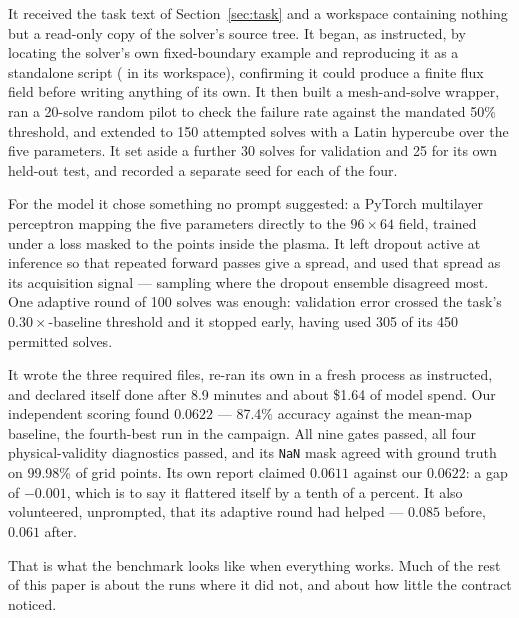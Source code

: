 It received the task text of Section~\ref{sec:task} and a workspace containing
nothing but a read-only copy of the solver's source tree. It began, as
instructed, by locating the solver's own fixed-boundary example and reproducing
it as a standalone script ( in its workspace),
confirming it could produce a finite flux field before writing anything of its
own. It then built a mesh-and-solve wrapper, ran a 20-solve random pilot to
check the failure rate against the mandated 50\% threshold, and extended to 150
attempted solves with a Latin hypercube over the five parameters. It set aside
a further 30 solves for validation and 25 for its own held-out test, and
recorded a separate seed for each of the four.

For the model it chose something no prompt suggested: a PyTorch multilayer
perceptron mapping the five parameters directly to the $96\times64$ field,
trained under a loss masked to the points inside the plasma. It left dropout
active at inference so that repeated forward passes give a spread, and used
that spread as its acquisition signal --- sampling where the dropout ensemble
disagreed most. One adaptive round of 100 solves was enough: validation error
crossed the task's $0.30\times$-baseline threshold and it stopped early, having
used 305 of its 450 permitted solves.

It wrote the three required files, re-ran its own  in a fresh
process as instructed, and declared itself done after 8.9 minutes and about
\$1.64 of model spend. Our independent scoring found \relltwo{} $0.0622$ ---
87.4\% accuracy against the mean-map baseline, the fourth-best run in the
campaign. All nine gates passed, all four physical-validity diagnostics passed,
and its \texttt{NaN} mask agreed with ground truth on 99.98\% of grid points.
Its own report claimed $0.0611$ against our $0.0622$: a gap of $-0.001$, which
is to say it flattered itself by a tenth of a percent. It also volunteered,
unprompted, that its adaptive round had helped --- $0.085$ before, $0.061$
after.

That is what the benchmark looks like when everything works. Much of the rest of
this paper is about the runs where it did not, and about how little the contract
noticed.
